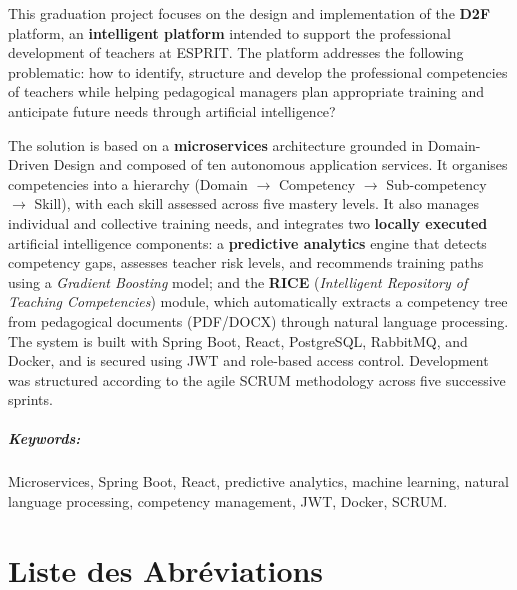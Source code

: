 \documentclass[12pt,a4paper]{report}
\begin{document}
This graduation project focuses on the design and implementation of the
\textbf{D2F} platform, an \textbf{intelligent platform} intended to support the
professional development of teachers at ESPRIT. The platform addresses the
following problematic: how to identify, structure and develop the professional
competencies of teachers while helping pedagogical managers plan appropriate
training and anticipate future needs through artificial intelligence?

The solution is based on a \textbf{microservices} architecture grounded in
Domain-Driven Design and composed of ten autonomous application services. It
organises competencies into a hierarchy
(Domain $\rightarrow$ Competency $\rightarrow$ Sub-competency $\rightarrow$ Skill),
with each skill assessed across five mastery levels. It also manages individual
and collective training needs, and integrates two \textbf{locally executed}
artificial intelligence components: a \textbf{predictive analytics} engine that
detects competency gaps, assesses teacher risk levels, and recommends training
paths using a \textit{Gradient Boosting} model; and the \textbf{RICE}
(\textit{Intelligent Repository of Teaching Competencies}) module, which
automatically extracts a competency tree from pedagogical documents (PDF/DOCX)
through natural language processing. The system is built with Spring Boot,
React, PostgreSQL, RabbitMQ, and Docker, and is secured using JWT and role-based
access control. Development was structured according to the agile SCRUM
methodology across five successive sprints.

\paragraph{Keywords:} Microservices, Spring Boot, React, predictive analytics,
machine learning, natural language processing, competency management, JWT,
Docker, SCRUM.

\clearpage
\tableofcontents
\clearpage
\listoftables
\clearpage
\listoffigures

\clearpage
\chapter*{Liste des Abréviations}
\thispagestyle{plain}
\end{document}
